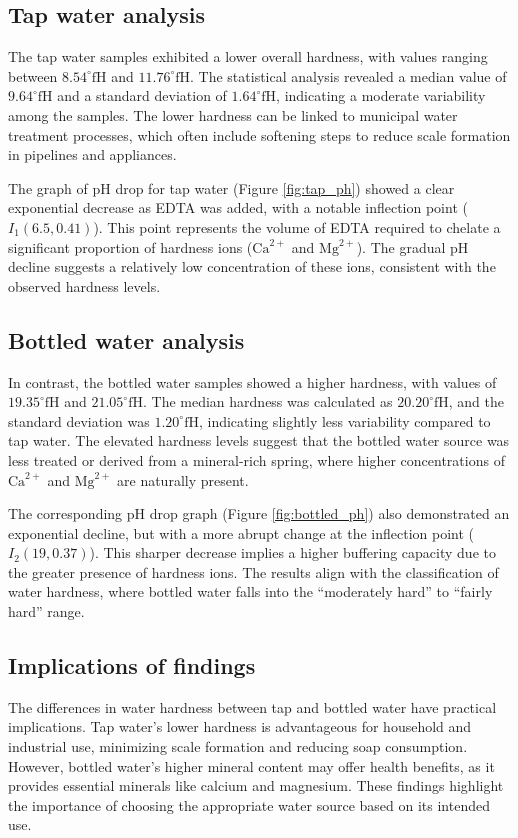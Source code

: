 \documentclass{article}
\begin{document}
\subsection{Tap water analysis}
The tap water samples exhibited a lower overall hardness, with values ranging between \(8.54^\circ\text{fH}\) and \(11.76^\circ\text{fH}\). The statistical analysis revealed a median value of \(9.64^\circ\text{fH}\) and a standard deviation of \(1.64^\circ\text{fH}\), indicating a moderate variability among the samples. The lower hardness can be linked to municipal water treatment processes, which often include softening steps to reduce scale formation in pipelines and appliances.

The graph of pH drop for tap water (Figure \ref{fig:tap_ph}) showed a clear exponential decrease as EDTA was added, with a notable inflection point (\(I_1(6.5, 0.41)\)). This point represents the volume of EDTA required to chelate a significant proportion of hardness ions (\(\text{Ca}^{2+}\) and \(\text{Mg}^{2+}\)). The gradual pH decline suggests a relatively low concentration of these ions, consistent with the observed hardness levels.

\subsection{Bottled water analysis}
In contrast, the bottled water samples showed a higher hardness, with values of \(19.35^\circ\text{fH}\) and \(21.05^\circ\text{fH}\). The median hardness was calculated as \(20.20^\circ\text{fH}\), and the standard deviation was \(1.20^\circ\text{fH}\), indicating slightly less variability compared to tap water. The elevated hardness levels suggest that the bottled water source was less treated or derived from a mineral-rich spring, where higher concentrations of \(\text{Ca}^{2+}\) and \(\text{Mg}^{2+}\) are naturally present.

The corresponding pH drop graph (Figure \ref{fig:bottled_ph}) also demonstrated an exponential decline, but with a more abrupt change at the inflection point (\(I_2(19, 0.37)\)). This sharper decrease implies a higher buffering capacity due to the greater presence of hardness ions. The results align with the classification of water hardness, where bottled water falls into the ``moderately hard'' to ``fairly hard'' range.

\subsection{Implications of findings}
The differences in water hardness between tap and bottled water have practical implications. Tap water's lower hardness is advantageous for household and industrial use, minimizing scale formation and reducing soap consumption. However, bottled water's higher mineral content may offer health benefits, as it provides essential minerals like calcium and magnesium. These findings highlight the importance of choosing the appropriate water source based on its intended use.
\end{document}
